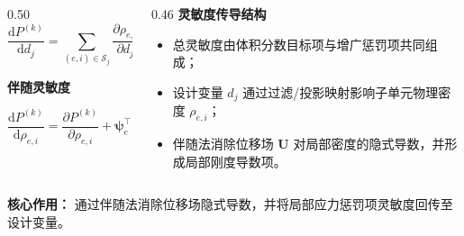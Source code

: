 \documentclass[notheorems]{beamer}
\begin{document}
\begin{frame}
{\begin{tcolorbox}
{\begin{columns}[T, totalwidth=\linewidth]
\begin{column}{0.50\linewidth}
							{\fontsize{7.0}{8.8}\selectfont
								\[
								\frac{\mathrm dP^{(k)}}{\mathrm d d_j}
								=
								\sum_{(e,i)\in\mathcal S_j}
								\frac{\partial \rho_{e,i}}{\partial d_j}
								\frac{\mathrm dP^{(k)}}{\mathrm d\rho_{e,i}}
								\]
							}
							
							{\bfseries\color{structure.fg}
								伴随灵敏度
							}
							
							\vspace{-1.0em}
							
							{\fontsize{7.0}{8.8}\selectfont
								\[
								\frac{\mathrm dP^{(k)}}{\mathrm d\rho_{e,i}}
								=
								\frac{\partial P^{(k)}}{\partial\rho_{e,i}}
								+
								\boldsymbol\psi_e^{\top}
								\frac{\partial\boldsymbol K_e}{\partial\rho_{e,i}}
								\boldsymbol U_e
								\]
							}
						\end{column}
						
						\begin{column}{0.46\linewidth}
							{\bfseries\color{structure.fg}
								灵敏度传导结构
							}
							
							\vspace{0.25em}
							
							\setlength{\leftmargini}{1.0em}
							\begin{itemize}
								\setlength{\itemsep}{4pt}
								\setlength{\topsep}{1pt}
								\setlength{\parsep}{0pt}
								\setlength{\parskip}{0pt}
								\item 总灵敏度由体积分数目标项与增广惩罚项共同组成；
								\item 设计变量 \(d_j\) 通过过滤/投影映射影响子单元物理密度 \(\rho_{e,i}\)；
								\item 伴随法消除位移场 \(\boldsymbol U\) 对局部密度的隐式导数，并形成局部刚度导数项。
							\end{itemize}
						\end{column}
						
					\end{columns}
				}
			\end{tcolorbox}
			
			\begin{tcolorbox}[
				colback=structure.fg,
				colframe=structure.fg,
				coltext=white,
				boxrule=0.45pt,
				arc=3pt,
				left=7pt, right=7pt, top=3pt, bottom=3pt]
				\centering
				{\fontsize{8.0}{10.5}\selectfont\sffamily
					\textbf{核心作用：}
					通过伴随法消除位移场隐式导数，并将局部应力惩罚项灵敏度回传至设计变量。
				}
			\end{tcolorbox}
		}
		
	\end{frame}
	
\end{document}
